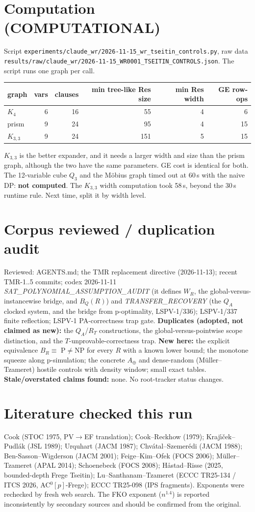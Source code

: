 \documentclass[11pt]{article}
\begin{document}
\section{Computation (COMPUTATIONAL)}
Script \texttt{experiments/claude\_wr/2026-11-15\_wr\_tseitin\_controls.py}, raw data
\texttt{results/raw/claude\_wr/2026-11-15\_WR0001\_TSEITIN\_CONTROLS.json}. The script runs one graph per call.
\begin{center}\begin{tabular}{lrrrrr}
graph & vars & clauses & min tree-like Res size & min Res width & GE row-ops\\\hline
$K_4$ & 6 & 16 & 55 & 4 & 6\\
prism & 9 & 24 & 95 & 4 & 15\\
$K_{3,3}$ & 9 & 24 & 151 & 5 & 15
\end{tabular}\end{center}
$K_{3,3}$ is the better expander, and it needs a larger width and size than the prism graph, although the
two have the same parameters. GE cost is identical for both. The 12-variable cube $Q_3$ and the
M\"obius graph timed out at 60\,s with the naive DP: \textbf{not computed}. The $K_{3,3}$ width computation
took 58\,s, beyond the 30\,s runtime rule. Next time, split it by width level.

\section{Corpus reviewed / duplication audit}
Reviewed: AGENTS.md; the TMR replacement directive (2026-11-13); recent TMR-1..5 commits;
codex 2026-11-11 \emph{SAT\_POLYNOMIAL\_ASSUMPTION\_AUDIT} (it defines $W_R$, the global-versus-instancewise
bridge, and $B_Q(R)$) and \emph{TRANSFER\_RECOVERY} (the $Q_A$ clocked system, and the bridge from
p-optimality, LSPV-1/336); LSPV-1/337 finite reflection; LSPV-1 PA-correctness trap gate.
\textbf{Duplicates (adopted, not claimed as new):} the $Q_A$/$R_T$ constructions, the global-versus-pointwise
scope distinction, and the $T$-unprovable-correctness trap.
\textbf{New here:} the explicit equivalence $B_R\equiv$ P${}\ne{}$NP for every $R$ with a known lower bound;
the monotone squeeze along p-simulation; the concrete $A_\oplus$ and dense-random (M\"uller--Tzameret)
hostile controls with density window; small exact tables.
\textbf{Stale/overstated claims found:} none. No root-tracker status changes.

\section{Literature checked this run}
Cook (STOC 1975, PV$\to$EF translation); Cook--Reckhow (1979); Kraj\'{\i}\v{c}ek--Pudl\'ak (JSL 1989);
Urquhart (JACM 1987); Chv\'atal--Szemer\'edi (JACM 1988); Ben-Sasson--Wigderson (JACM 2001);
Feige--Kim--Ofek (FOCS 2006); M\"uller--Tzameret (APAL 2014); Schoenebeck (FOCS 2008);
H\aa stad--Risse (2025, bounded-depth Frege Tseitin); Lu--Santhanam--Tzameret (ECCC TR25-134 /
ITCS 2026, AC$^0[p]$-Frege); ECCC TR25-098 (IPS fragments). Exponents were rechecked by fresh web search.
The FKO exponent ($n^{1.4}$) is reported inconsistently by secondary sources and should be confirmed from
the original.
\end{document}
